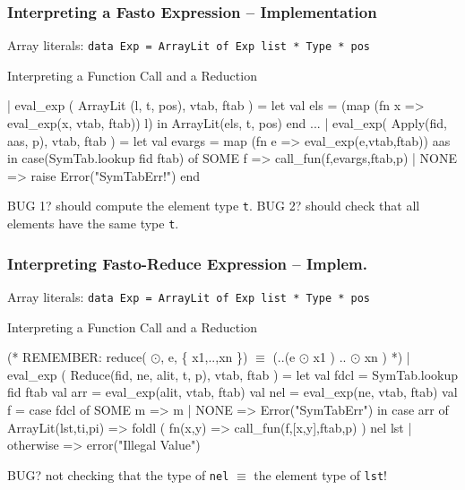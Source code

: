 \documentclass{beamer}
\newcommand{\emp}[1]{\textcolor{DikuRed}{ #1}}
\newcommand{\emphh}[1]{\textcolor{CosGreen}{ #1}}
\newcommand{\mymath}[1]{$ #1 $}
\begin{document}
\begin{frame}[fragile, t]
\frametitle{Interpreting a Fasto Expression -- Implementation}

\smallskip

Array literals: {\tt data Exp = ArrayLit of Exp list * Type * pos}
\bigskip

\begin{block}{Interpreting a Function Call and a Reduction}
\begin{colorcode}[fontsize=\scriptsize]
  | \emphh{eval\_exp} ( ArrayLit (l, t, pos), vtab, ftab ) =
        let val els = \emp{(map (fn x => eval_exp(x, vtab, ftab)) l)}
        in ArrayLit(els, \alert{t}, pos)
        end
  ...
  | \emphh{eval\_exp}( Apply(fid, aas, p), vtab, ftab ) =
        let val evargs = map (fn e => \emphh{eval\_exp}(e,vtab,ftab)) aas
        in case(SymTab.lookup fid ftab) of
             SOME f => \emp{call\_fun}(f,evargs,ftab,p)
           | NONE   => raise Error("SymTabErr!")
        end
\end{colorcode} 
\end{block}

\alert{BUG 1?} \pause \alert{should compute the element type {\tt t}}.
\alert{BUG 2?}        \alert{should check that all elements have the same type {\tt t}}.  
\end{frame}


\begin{frame}[fragile, t]
\frametitle{Interpreting Fasto-Reduce Expression -- Implem.}

\smallskip

Array literals: {\tt data Exp = ArrayLit of Exp list * Type * pos}
\bigskip

\begin{block}{Interpreting a Function Call and a Reduction}
\begin{colorcode}[fontsize=\scriptsize]
(* REMEMBER: \emp{reduce( \mymath{\odot}, e, \{ x1,..,xn \}) \mymath{\equiv} (..(e \mymath{\odot} x1 ) .. \mymath{\odot} xn )} *)
  | \emphh{eval\_exp} ( Reduce(fid, ne, alit, t, p), vtab, ftab ) =
      let val fdcl = SymTab.lookup fid ftab
          val arr  = \emphh{eval\_exp}(alit, vtab, ftab)
          val nel  = \emphh{eval\_exp}(ne,   vtab, ftab)
          val f    = case fdcl of
                       SOME m => m
                     | NONE   => Error("SymTabErr")
      in case arr of
           ArrayLit(lst,ti,pi) =>
               \emp{foldl} ( fn(x,y) => \alert{call\_fun}(f,[x,y],ftab,p) ) nel lst
         | otherwise => error("Illegal Value")
\end{colorcode} 
\end{block}

\bigskip

\alert{BUG?} not checking that the type of {\tt nel} $\equiv$ the element type of {\tt lst}!

\end{frame}
\end{document}
